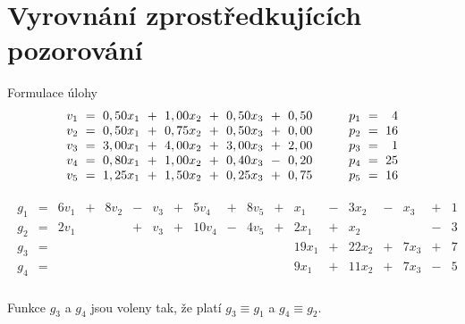%
% 
% 
% 
% 
%

\section*{Vyrovnání zprostředkujících pozorování}


\begin{Example}{Formulace úlohy}
\begin{align*}
\arraycolsep=3pt
\begin{array}{rrrrrrrrrrrrr}
   v_1 &=& 0,50x_1 &+& 1,00x_2 &+& 0,50x_3 &+& 0,50 \Sep  p_1 &=&  4 \\
   v_2 &=& 0,50x_1 &+& 0,75x_2 &+& 0,50x_3 &+& 0,00 \Sep  p_2 &=& 16 \\
   v_3 &=& 3,00x_1 &+& 4,00x_2 &+& 3,00x_3 &+& 2,00 \Sep  p_3 &=&  1 \\
   v_4 &=& 0,80x_1 &+& 1,00x_2 &+& 0,40x_3 &-& 0,20 \Sep  p_4 &=& 25 \\
   v_5 &=& 1,25x_1 &+& 1,50x_2 &+& 0,25x_3 &+& 0,75 \Sep  p_5 &=& 16 \\
\end{array}
\end{align*}
\end{Example}
%
\bgroup%
{}%
%
\begin{Example}{}
\bgroup\setlength{\abovedisplayskip}{0pt}

\begin{align*}
\begin{array}{rrrrrrrrrrrrrrrrrrr}
g_1 &=& 6v_1 &+& 8v_2 &-& v_3 &+&  5v_4 &+& 8v_5  &+&
                     x_1 &-&  3x_2 &-&  x_3 &+& 1\\
g_2 &=& 2v_1 & &      &+& v_3 &+& 10v_4 &-& 4v_5  &+&
                    2x_1 &+& x_2   & &      &-& 3\\
g_3 &=& &&&&&&&&&& 19x_1 &+& 22x_2 &+& 7x_3 &+& 7\\
g_4 &=& &&&&&&&&&&  9x_1 &+& 11x_2 &+& 7x_3 &-& 5\\
\end{array}
\end{align*}
\egroup
\end{Example}

\noindent
Funkce $g_3$ a $g_4$ jsou voleny tak, že platí $g_3 \equiv g_1$ a
$g_4 \equiv g_2$.

